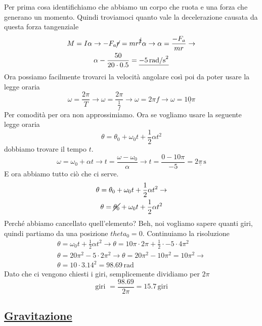Per prima cosa identifichiamo che abbiamo un corpo che ruota e una forza che generano un momento. 
Quindi troviamoci quanto vale la decelerazione causata da questa forza tangenziale
\begin{gather*}
M = I\alpha \rightarrow -F_a\cancel{r} = mr^{\cancel{2}}\alpha \rightarrow
\alpha = \frac{-F_a}{mr} \rightarrow \\\alpha -\frac{50}{20\cdot0.5} = \underline{-5\,\text{rad/s}^2}
\end{gather*}
Ora possiamo facilmente trovarci la velocità angolare così poi da poter usare la legge oraria
\begin{equation*}
\omega = \frac{2\pi}{T} \rightarrow \omega = \frac{2\pi}{\frac{1}{f}} \rightarrow \omega = 2\pi f
\rightarrow \omega = \underline{10\pi}
\end{equation*}
Per comodità per ora non approssimiamo. Ora se vogliamo usare la seguente legge oraria
\begin{equation*}
\theta = \theta_0+\omega_0t+\frac{1}{2}\alpha t^2
\end{equation*}
dobbiamo trovare il tempo $t$.
\begin{equation*}
\omega = \omega_0 + \alpha t \rightarrow t = \frac{\omega-\omega_0}{\alpha} \rightarrow
t = \frac{0 - 10\pi}{-5} = \underline{2\pi\,\text{s}}
\end{equation*}
E ora abbiamo tutto ciò che ci serve.
\begin{gather*}
\theta = \theta_0+\omega_0t+\frac{1}{2}\alpha t^2 \rightarrow\\
\theta = \cancel{\theta_0}+\omega_0t+\frac{1}{2}\alpha t^2
\end{gather*}
Perché abbiamo cancellato quell'elemento? Beh, noi vogliamo sapere quanti giri, quindi partiamo da
una posizione $theta_0 = 0$. Continuiamo la risoluzione
\begin{gather*}
\theta = \omega_0t+\frac{1}{2}\alpha t^2 \rightarrow
\theta = 10\pi\cdot2\pi + \frac{1}{2}\cdot-5\cdot4\pi^2\\
\theta = 20\pi^2 - 5\cdot2\pi^2 \rightarrow \theta = 20\pi^2-10\pi^2 = 10\pi^2 \rightarrow \\
\theta = 10\cdot3.14^2 = \boxed{98.69\,\text{rad}}
\end{gather*}
Dato che ci vengono chiesti i giri, semplicemente dividiamo per $2\pi$
\begin{equation*}
\text{giri } = \frac{98.69}{2\pi} = \boxed{15.7\,\text{giri}}
\end{equation*}
	
\subsection*{\hyperref[sec:gravitazione]{Gravitazione}}\label{ex:gravitazione}
